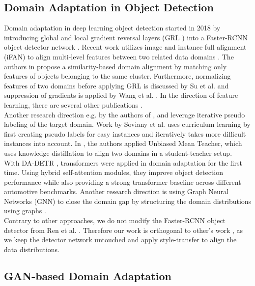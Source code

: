 \documentclass[10pt,twocolumn,letterpaper]{article}
\begin{document}
\subsection{Domain Adaptation in Object Detection}
Domain adaptation in deep learning object detection started in 2018 by introducing global and local gradient reversal layers (GRL \cite{GRL}) into a Faster-RCNN object detector network \cite{DAFasterRCNN,StrongWeak}. Recent work utilizes image and instance full alignment (iFAN) to align multi-level features between two related data domains \cite{iFAN}. The authors in \cite{SeekingSimilarities} propose a similarity-based domain alignment by matching only features of objects belonging to the same cluster. Furthermore, normalizing features of two domains before applying GRL is discussed by Su et al. \cite{CDN} and suppression of gradients is applied by Wang et al. \cite{wang2021domain}. In the direction of feature learning, there are several other publications \cite{xu2020exploring,chen2020harmonizing,vs2021mega}.\\
Another research direction e.g. by the authors of \cite{ProgressiveDomainAdaptation}, \cite{li2021category} and \cite{UDA} leverage iterative pseudo labeling of the target domain. Work by Soviany et al. uses curriculum learning \cite{Curriculum} by first creating pseudo labels for easy instances and iteratively takes more difficult instances into account. In \cite{UMT}, the authors applied Unbiased Mean Teacher, which uses knowledge distillation to align two domains in a student-teacher setup. \\
With DA-DETR \cite{DADETR}, transformers were applied in domain adaptation for the first time. Using hybrid self-attention modules, they improve object detection performance while also providing a strong transformer baseline across different automotive benchmarks. Another research direction is using Graph Neural Networks (GNN) to close the domain gap by structuring the domain distributions using graphs \cite{xu2020cross,li2022scan}. \\
Contrary to other approaches, we do not modify the Faster-RCNN object detector from Ren et al. \cite{FasterRCNN}. Therefore our work is orthogonal to other's work \cite{DAFasterRCNN,EveryPixelMatters,iFAN}, as we keep the detector network untouched and apply style-transfer to align the data distributions.

\subsection{GAN-based Domain Adaptation}
\end{document}
